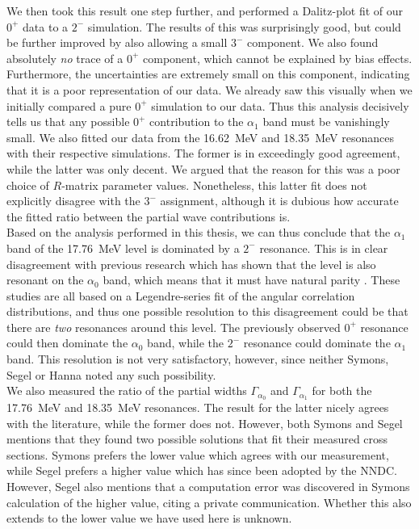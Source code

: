 We then took this result one step further, and performed a Dalitz-plot fit of our $0^+$ data to a $2^-$ simulation. The results of this was surprisingly good, but could be further improved by also allowing a small $3^-$ component. We also found absolutely \textit{no} trace of a $0^+$ component, which cannot be explained by bias effects. Furthermore, the uncertainties are extremely small on this component, indicating that it is a poor representation of our data. We already saw this visually when we initially compared a pure $0^+$ simulation to our data. Thus this analysis decisively tells us that any possible $0^+$ contribution to the $\alpha_1$ band must be vanishingly small. We also fitted our data from the \SI{16.62}{MeV} and \SI{18.35}{MeV} resonances with their respective simulations. The former is in exceedingly good agreement, while the latter was only decent. We argued that the reason for this was a poor choice of $R$-matrix parameter values. Nonetheless, this latter fit does not explicitly disagree with the $3^-$ assignment, although it is dubious how accurate the fitted ratio between the partial wave contributions is. \\

Based on the analysis performed in this thesis, we can thus conclude that the $\alpha_1$ band of the \SI{17.76}{MeV} level is dominated by a $2^-$ resonance. This is in clear disagreement with previous research which has shown that the level is also resonant on the $\alpha_0$ band, which means that it must have natural parity \cite{Symons}\cite{Segel}\cite{Munch}. These studies are all based on a Legendre-series fit of the angular correlation distributions, and thus one possible resolution to this disagreement could be that there are \textit{two} resonances around this level. The previously observed $0^+$ resonance could then dominate the $\alpha_0$ band, while the $2^-$ resonance could dominate the $\alpha_1$ band. This resolution is not very satisfactory, however, since neither Symons, Segel or Hanna \cite{Hanna} noted any such possibility. \\

We also measured the ratio of the partial widths  $\Gamma_{\alpha_0}$ and $\Gamma_{\alpha_1}$ for both the \SI{17.76}{MeV} and \SI{18.35}{MeV} resonances. The result for the latter nicely agrees with the literature, while the former does not. However, both Symons and Segel mentions that they found two possible solutions that fit their measured cross sections. Symons prefers the lower value which agrees with our measurement, while Segel prefers a higher value which has since been adopted by the NNDC. However, Segel also mentions that a computation error was discovered in Symons calculation of the higher value, citing a private communication. Whether this also extends to the lower value we have used here is unknown. \\

